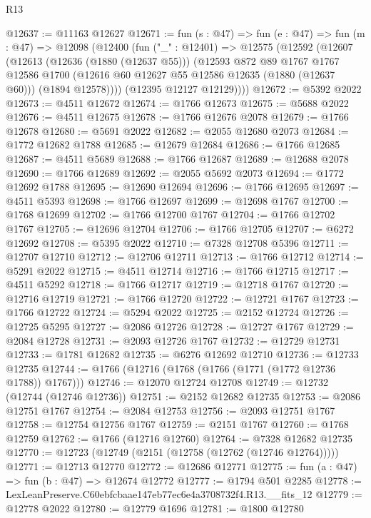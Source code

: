\begin{lexlean}{R13}
\begin{coremodule}
@12637 := @11163 @12627
@12671 := fun (s : @47) =>
  fun (e : @47) =>
  fun (m : @47) =>
  @12098
    (@12400
      (fun ("_" : @12401) =>
      @12575
        (@12592
          (@12607
            (@12613
              (@12636 (@1880 (@12637 @55)))
              (@12593
                @872
                @89
                @1767
                @1767
                @12586
                @1700
                (@12616 @60 @12627 @55 @12586 @12635 (@1880 (@12637 @60)))
                (@1894 @12578))))
          (@12395 @12127 @12129))))
@12672 := @5392 @2022
@12673 := @4511 @12672
@12674 := @1766 @12673
@12675 := @5688 @2022
@12676 := @4511 @12675
@12678 := @1766 @12676 @2078
@12679 := @1766 @12678
@12680 := @5691 @2022
@12682 := @2055 @12680 @2073
@12684 := @1772 @12682 @1788
@12685 := @12679 @12684
@12686 := @1766 @12685
@12687 := @4511 @5689
@12688 := @1766 @12687
@12689 := @12688 @2078
@12690 := @1766 @12689
@12692 := @2055 @5692 @2073
@12694 := @1772 @12692 @1788
@12695 := @12690 @12694
@12696 := @1766 @12695
@12697 := @4511 @5393
@12698 := @1766 @12697
@12699 := @12698 @1767
@12700 := @1768 @12699
@12702 := @1766 @12700 @1767
@12704 := @1766 @12702 @1767
@12705 := @12696 @12704
@12706 := @1766 @12705
@12707 := @6272 @12692
@12708 := @5395 @2022
@12710 := @7328 @12708 @5396
@12711 := @12707 @12710
@12712 := @12706 @12711
@12713 := @1766 @12712
@12714 := @5291 @2022
@12715 := @4511 @12714
@12716 := @1766 @12715
@12717 := @4511 @5292
@12718 := @1766 @12717
@12719 := @12718 @1767
@12720 := @12716 @12719
@12721 := @1766 @12720
@12722 := @12721 @1767
@12723 := @1766 @12722
@12724 := @5294 @2022
@12725 := @2152 @12724
@12726 := @12725 @5295
@12727 := @2086 @12726
@12728 := @12727 @1767
@12729 := @2084 @12728
@12731 := @2093 @12726 @1767
@12732 := @12729 @12731
@12733 := @1781 @12682
@12735 := @6276 @12692 @12710
@12736 := @12733 @12735
@12744 := @1766 (@12716 (@1768 (@1766 (@1771 (@1772 @12736 @1788)) @1767)))
@12746 := @12070 @12724 @12708
@12749 := @12732 (@12744 (@12746 @12736))
@12751 := @2152 @12682 @12735
@12753 := @2086 @12751 @1767
@12754 := @2084 @12753
@12756 := @2093 @12751 @1767
@12758 := @12754 @12756 @1767
@12759 := @2151 @1767
@12760 := @1768 @12759
@12762 := @1766 (@12716 @12760)
@12764 := @7328 @12682 @12735
@12770 := @12723 (@12749 (@2151 (@12758 (@12762 (@12746 @12764)))))
@12771 := @12713 @12770
@12772 := @12686 @12771
@12775 := fun (a : @47) => fun (b : @47) => @12674 @12772
@12777 := @1794 @501 @2285
@12778 := LexLeanPreserve.C60ebfcbaae147eb77ec6e4a3708732f4.R13.__fits_12
@12779 := @12778 @2022
@12780 := @12779 @1696
@12781 := @1800 @12780

\end{coremodule}
\end{lexlean}
